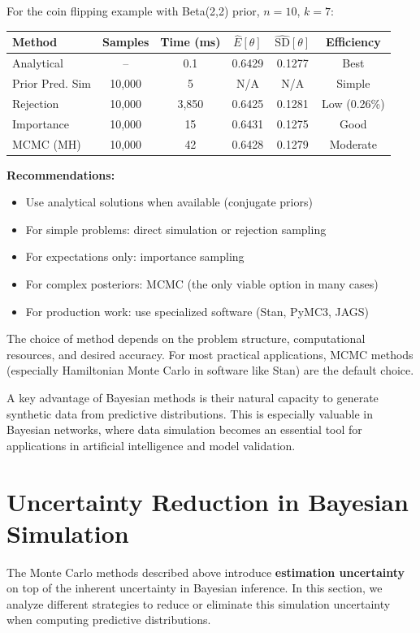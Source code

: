 \begin{examplebox}
\begin{example}
For the coin flipping example with Beta(2,2) prior, $n=10$, $k=7$:

\begin{center}
\begin{tabular}{lccccc}
\toprule
Method & Samples & Time (ms) & $\hat{E}[\theta]$ & $\hat{\text{SD}}[\theta]$ & Efficiency \\
\midrule
Analytical & -- & 0.1 & 0.6429 & 0.1277 & Best \\
Prior Pred. Sim & 10,000 & 5 & N/A & N/A & Simple \\
Rejection & 10,000 & 3,850 & 0.6425 & 0.1281 & Low (0.26\%) \\
Importance & 10,000 & 15 & 0.6431 & 0.1275 & Good \\
MCMC (MH) & 10,000 & 42 & 0.6428 & 0.1279 & Moderate \\
\bottomrule
\end{tabular}
\end{center}
\textbf{Recommendations:}
\begin{itemize}
\item Use analytical solutions when available (conjugate priors)
\item For simple problems: direct simulation or rejection sampling
\item For expectations only: importance sampling
\item For complex posteriors: MCMC (the only viable option in many cases)
\item For production work: use specialized software (Stan, PyMC3, JAGS)
\end{itemize}
\end{example}
\end{examplebox}

The choice of method depends on the problem structure, computational resources, and desired accuracy. For most practical applications, MCMC methods (especially Hamiltonian Monte Carlo in software like Stan) are the default choice.

A key advantage of Bayesian methods is their natural capacity to generate synthetic data from predictive distributions. This is especially valuable in Bayesian networks, where data simulation becomes an essential tool for applications in artificial intelligence and model validation.

\section{Uncertainty Reduction in Bayesian Simulation}\label{sec:reducing_uncertainty}
The Monte Carlo methods described above introduce \textbf{estimation uncertainty} on top of the inherent uncertainty in Bayesian inference. In this section, we analyze different strategies to reduce or eliminate this simulation uncertainty when computing predictive distributions.

